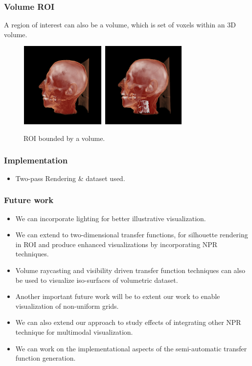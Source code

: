 \documentclass{beamer}
\begin{document}
\begin{frame}
\frametitle{Volume ROI}
A region of interest can also be a volume, which is set of voxels within an 3D volume.
\begin{figure}
\centering
\includegraphics[height=120pt, width=120pt]{NON-VOI.png}
\includegraphics[height=120pt, width=120pt]{VOI.png}
\caption{\label{fig:ray_cast1.jpg} ROI bounded by a volume.}
\end{figure}
\end{frame}




\begin{frame}
\frametitle{Implementation }
\begin{itemize}
\item Two-pass Rendering \& dataset used.
\end{itemize}
\end{frame}



\begin{frame}
\frametitle{Future work }
\begin{itemize}
\item We can incorporate lighting for better illustrative visualization. 
\item We can extend to two-dimensional transfer functions, for silhouette rendering in ROI and produce enhanced visualizations by incorporating NPR techniques. 
\item Volume raycasting and visibility driven transfer function techniques can also be used to visualize iso-surfaces of volumetric dataset. 
\item Another important future work will be to extent our work to enable visualization of non-uniform grids.
\item We can also extend our approach to study effects of integrating other NPR technique for multimodal visualization. 
\item We can work on the implementational aspects of the semi-automatic
transfer function generation.
\end{itemize}
\end{frame}
\end{document}
